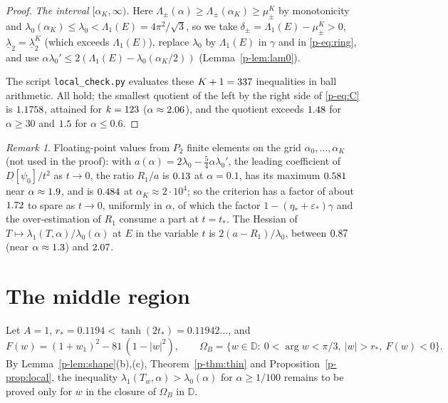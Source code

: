 \documentclass[11pt]{article}
\theoremstyle{remark}
\newtheorem{remark}[theorem]{Remark}
\begin{document}
\begin{proof}
\emph{The interval $[\alpha_K,\infty)$.} Here $\Lambda_\pm(\alpha)\ge\Lambda_\pm(\alpha_K)\ge\mu_\pm^K$
by monotonicity and $\lambda_0(\alpha_K)\le\lambda_0<\Lambda_1(E)=4\pi^2/\sqrt3$, so we take
$\delta_\pm=\Lambda_1(E)-\mu_\pm^K>0$, $\underline\lambda_2=\underline\lambda_2^K$ (which
exceeds $\Lambda_1(E)$), replace
$\lambda_0$ by $\Lambda_1(E)$ in $\gamma$ and in \eqref{p-eq:ring}, and use
$\alpha\lambda_0'\le2(\Lambda_1(E)-\lambda_0(\alpha_K/2))$ (Lemma~\ref{p-lem:lam0}).

The script \texttt{local\_check.py} evaluates these $K+1=337$ inequalities in ball arithmetic.
All hold; the smallest quotient of the left by the right side of \eqref{p-eq:C} is $1.1758$, attained
for $k=123$ ($\alpha\approx2.06$), and the quotient exceeds $1.48$ for
$\alpha\ge30$ and $1.5$ for $\alpha\le0.6$.
\end{proof}

\begin{remark}\label{p-rem:local}
Floating-point values from $P_2$ finite elements on the grid $\alpha_0,\dots,\alpha_K$ (not used in
the proof): with $a(\alpha)=2\lambda_0-\frac54\alpha\lambda_0'$, the leading coefficient of
$D[\psi_0]/t^2$ as $t\to0$, the ratio $R_1/a$ is $0.13$ at $\alpha=0.1$, has its maximum
$0.581$ near $\alpha\approx1.9$, and is $0.484$ at $\alpha_K\approx2\cdot10^4$; so the
criterion has a factor of about $1.72$ to spare as $t\to0$, uniformly in $\alpha$, of which the
factor $1-(\eta_*+\varepsilon_*)\gamma$ and the over-estimation of $R_1$ consume a part at $t=t_*$. The
Hessian of $T\mapsto\lambda_1(T,\alpha)/\lambda_0(\alpha)$ at $E$ in the variable $t$ is
$2(a-R_1)/\lambda_0$, between $0.87$ (near $\alpha\approx1.3$) and $2.07$.
\end{remark}


\section{The middle region}\label{p-sec:middle}

Let $A=1$, $r_*=0.1194<\tanh(2t_*)=0.11942\ldots$, and
\[
  F(w)=(1+w_1)^2-81\,(1-|w|^2),\qquad
  \Omega_B=\bigl\{w\in\mathbb D:\ 0<\arg w<\pi/3,\ |w|>r_*,\ F(w)<0\bigr\}.
\]
By Lemma~\ref{p-lem:shape}(b),(c), Theorem~\ref{p-thm:thin} and Proposition~\ref{p-prop:local}, the
inequality $\lambda_1(T_w,\alpha)>\lambda_0(\alpha)$ for $\alpha\ge1/100$ remains to be proved
only for $w$ in the closure of $\Omega_B$ in $\mathbb D$.
\end{document}
